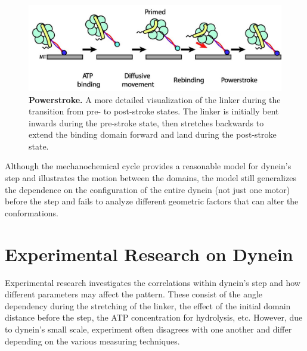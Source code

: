 \begin{figure}[H]
	\centering
	\includegraphics[width=1\columnwidth]{Figures/powerstroke.jpeg}
	\caption[Powerstroke]{\textbf{Powerstroke.} A more detailed visualization of the linker during the transition from pre- to post-stroke states. The linker is initially bent inwards during the pre-stroke state, then stretches backwards to extend the binding domain forward and land during the post-stroke state. \cite{Carter2010communication} }
	\label{fig:Powerstroke}
\end{figure}

Although the mechanochemical cycle provides a reasonable model for dynein's step and illustrates the motion between the domains, the model still generalizes the dependence on the configuration of the entire dynein (not just one motor) before the step and fails to analyze different geometric factors that can alter the conformations.

\section{Experimental Research on Dynein}

Experimental research investigates the correlations within dynein's step and how different parameters may affect the pattern. These consist of the angle dependency during the stretching of the linker, the effect of the initial domain distance before the step, the ATP concentration for hydrolysis, etc. However, due to dynein's small scale, experiment often disagrees with one another and differ depending on the various measuring techniques. 


